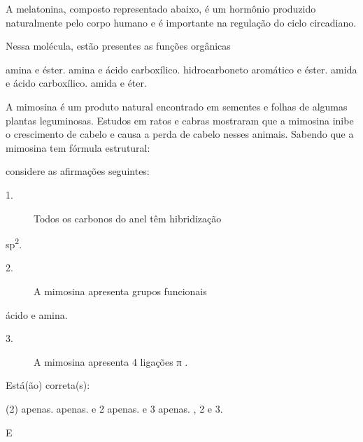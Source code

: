 \documentclass[11pt]{scrartcl}
\begin{document}
\begin{exercise}[points=1]
A melatonina, composto representado abaixo, é um hormônio produzido naturalmente pelo corpo
humano e é importante na regulação do ciclo circadiano.
\vspace{1cm}
\begin{center}
\end{center}

Nessa molécula, estão presentes as funções orgânicas
\begin{choice}
\choice  amina e éster.
\choice amina e ácido carboxílico.
\choice hidrocarboneto aromático e éster.
\choice amida e ácido carboxílico.
\choice  amida e éter.
\end{choice}
\end{exercise}

\begin{exercise}[points=1]
A mimosina é um produto natural encontrado em sementes e folhas de algumas plantas leguminosas. Estudos em ratos e cabras mostraram que a mimosina
inibe o crescimento de cabelo e causa a perda de cabelo nesses animais. Sabendo que a mimosina tem fórmula estrutural:
\vspace{.5cm}

\begin{center}
 \vspace{.3cm}
\end{center}

considere as afirmações seguintes:

\begin{description}
\item[{1.}] Todos os carbonos do anel têm hibridização
\end{description}
sp\textsuperscript{2}.
\begin{description}
\item[{2.}] A mimosina apresenta grupos funcionais
\end{description}
ácido e amina.
\begin{description}
\item[{3.}] A mimosina apresenta 4 ligações π .
\end{description}

Está(ão) correta(s):

\begin{choice}(2)
 apenas.
 apenas.
 e 2 apenas.
 e 3 apenas.
, 2 e 3.
\end{choice}
\end{exercise}
\begin{solution}
E
\end{solution}
\end{document}
